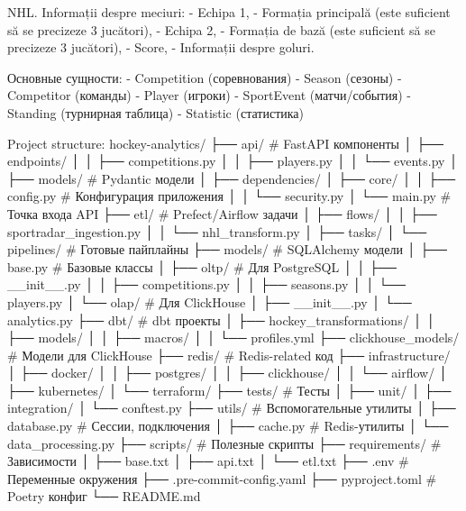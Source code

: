NHL. 
Informații despre meciuri: 
- Echipa 1, 
- Formația principală (este suficient să se precizeze 3 jucători), 
- Echipa 2, 
- Formația de bază (este suficient să se precizeze 3 jucători), 
- Score, 
- Informații despre goluri.

Основные сущности:
- Competition (соревнования)
- Season (сезоны)
- Competitor (команды)
- Player (игроки)
- SportEvent (матчи/события)
- Standing (турнирная таблица)
- Statistic (статистика)

Project structure:
hockey-analytics/
├── api/                          # FastAPI компоненты
│   ├── endpoints/
│   │   ├── competitions.py
│   │   ├── players.py
│   │   └── events.py
│   ├── models/                   # Pydantic модели
│   ├── dependencies/
│   ├── core/
│   │   ├── config.py            # Конфигурация приложения
│   │   └── security.py
│   └── main.py                  # Точка входа API
├── etl/                          # Prefect/Airflow задачи
│   ├── flows/
│   │   ├── sportradar_ingestion.py
│   │   └── nhl_transform.py
│   ├── tasks/
│   └── pipelines/               # Готовые пайплайны
├── models/                       # SQLAlchemy модели
│   ├── base.py                  # Базовые классы
│   ├── oltp/                    # Для PostgreSQL
│   │   ├── __init__.py
│   │   ├── competitions.py
│   │   ├── seasons.py
│   │   └── players.py
│   └── olap/                    # Для ClickHouse
│       ├── __init__.py
│       └── analytics.py
├── dbt/                         # dbt проекты
│   ├── hockey_transformations/
│   │   ├── models/
│   │   ├── macros/
│   │   └── profiles.yml
├── clickhouse_models/           # Модели для ClickHouse
├── redis/                       # Redis-related код
├── infrastructure/
│   ├── docker/
│   │   ├── postgres/
│   │   ├── clickhouse/
│   │   └── airflow/
│   ├── kubernetes/
│   └── terraform/
├── tests/                       # Тесты
│   ├── unit/
│   ├── integration/
│   └── conftest.py
├── utils/                       # Вспомогательные утилиты
│   ├── database.py             # Сессии, подключения
│   ├── cache.py                # Redis-утилиты
│   └── data_processing.py
├── scripts/                     # Полезные скрипты
├── requirements/                # Зависимости
│   ├── base.txt
│   ├── api.txt
│   └── etl.txt
├── .env                        # Переменные окружения
├── .pre-commit-config.yaml
├── pyproject.toml             # Poetry конфиг
└── README.md